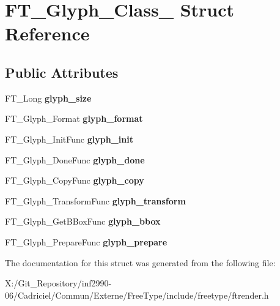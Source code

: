 \hypertarget{struct_f_t___glyph___class__}{\section{F\-T\-\_\-\-Glyph\-\_\-\-Class\-\_\- Struct Reference}
\label{struct_f_t___glyph___class__}
}
\subsection*{Public Attributes}
\begin{DoxyCompactItemize}
\item 
\hypertarget{struct_f_t___glyph___class___a1a76c68b9fb0e93947e888c0fe77cbf8}{F\-T\-\_\-\-Long {\bfseries glyph\-\_\-size}}\label{struct_f_t___glyph___class___a1a76c68b9fb0e93947e888c0fe77cbf8}

\item 
\hypertarget{struct_f_t___glyph___class___a26738bd14d5845e18d09ccaa3a709d23}{F\-T\-\_\-\-Glyph\-\_\-\-Format {\bfseries glyph\-\_\-format}}\label{struct_f_t___glyph___class___a26738bd14d5845e18d09ccaa3a709d23}

\item 
\hypertarget{struct_f_t___glyph___class___a657200ad15ff061b38fb25b168737f95}{F\-T\-\_\-\-Glyph\-\_\-\-Init\-Func {\bfseries glyph\-\_\-init}}\label{struct_f_t___glyph___class___a657200ad15ff061b38fb25b168737f95}

\item 
\hypertarget{struct_f_t___glyph___class___aabf05a4368dccacf45e1a54e542e5d63}{F\-T\-\_\-\-Glyph\-\_\-\-Done\-Func {\bfseries glyph\-\_\-done}}\label{struct_f_t___glyph___class___aabf05a4368dccacf45e1a54e542e5d63}

\item 
\hypertarget{struct_f_t___glyph___class___afc78dcdc4802760ebcaccf3a7b6cd088}{F\-T\-\_\-\-Glyph\-\_\-\-Copy\-Func {\bfseries glyph\-\_\-copy}}\label{struct_f_t___glyph___class___afc78dcdc4802760ebcaccf3a7b6cd088}

\item 
\hypertarget{struct_f_t___glyph___class___a5f72ac1d0d92eb31fa3e2bb721a97ef2}{F\-T\-\_\-\-Glyph\-\_\-\-Transform\-Func {\bfseries glyph\-\_\-transform}}\label{struct_f_t___glyph___class___a5f72ac1d0d92eb31fa3e2bb721a97ef2}

\item 
\hypertarget{struct_f_t___glyph___class___a06bfad431865c6731305cb781f78b317}{F\-T\-\_\-\-Glyph\-\_\-\-Get\-B\-Box\-Func {\bfseries glyph\-\_\-bbox}}\label{struct_f_t___glyph___class___a06bfad431865c6731305cb781f78b317}

\item 
\hypertarget{struct_f_t___glyph___class___af7f406e5ea20a6614c946746938830c9}{F\-T\-\_\-\-Glyph\-\_\-\-Prepare\-Func {\bfseries glyph\-\_\-prepare}}\label{struct_f_t___glyph___class___af7f406e5ea20a6614c946746938830c9}

\end{DoxyCompactItemize}


The documentation for this struct was generated from the following file\-:\begin{DoxyCompactItemize}
\item 
X\-:/\-Git\-\_\-\-Repository/inf2990-\/06/\-Cadriciel/\-Commun/\-Externe/\-Free\-Type/include/freetype/ftrender.\-h\end{DoxyCompactItemize}
